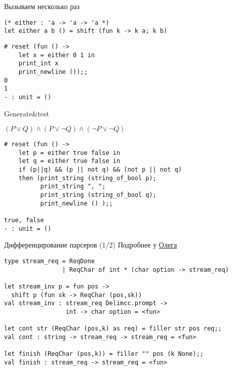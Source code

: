 \documentclass{beamer}
\begin{document}
\begin{frame}[fragile]{Вызываем несколько раз}
\begin{lstlisting}[style={camlstyle1}]
(* either : 'a -> 'a -> 'a *)
let either a b () = shift (fun k -> k a; k b)
\end{lstlisting}
\vspace{1cm}
\begin{lstlisting}[style={camlstyle1}]
# reset (fun () -> 
    let x = either 0 1 in
    print_int x
    print_newline ());;
0
1
- : unit = ()
\end{lstlisting}
\end{frame}

\begin{frame}[fragile]{Generate\&test}
\begin{center}
$(P \vee Q) \wedge (P \vee \neg Q) \wedge (\neg P \vee \neg Q)$
\end{center}
\vspace{1cm}
\begin{lstlisting}[style={camlstyle1}]
# reset (fun () -> 
    let p = either true false in
    let q = either true false in
    if (p||q) && (p || not q) && (not p || not q)
    then (print_string (string_of_bool p);
          print_string ", ";
          print_string (string_of_bool q);
          print_newline () );;
    
true, false
- : unit = ()
\end{lstlisting}
\end{frame}

\begin{frame}[fragile]{Дифференцирование парсеров (1/2)} 
Подробнее у \href{http://okmij.org/ftp/continuations/differentiating-parsers.html}{Олега }

\begin{lstlisting}[style={camlstyle1}]
type stream_req = ReqDone 
                | ReqChar of int * (char option -> stream_req)

let stream_inv p = fun pos -> 
  shift p (fun sk -> ReqChar (pos,sk))
val stream_inv : stream_req Delimcc.prompt -> 
                 int -> char option = <fun>

let cont str (ReqChar (pos,k) as req) = filler str pos req;;
val cont : string -> stream_req -> stream_req = <fun>
     
let finish (ReqChar (pos,k)) = filler "" pos (k None);;
val finish : stream_req -> stream_req = <fun>
\end{lstlisting}
\end{frame}
\end{document}
